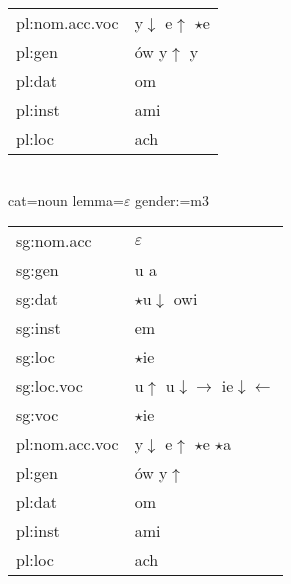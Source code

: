 \documentclass{article}
\begin{document}
\begin{multicols}{2}
\begin{tabular}{l|l}
pl:nom.acc.voc & y$\downarrow$ e$\uparrow$ $\star$e\\
pl:gen & ów y$\uparrow$ y\\
pl:dat & om\\
pl:inst & ami\\
pl:loc & ach\\
\end{tabular}\\
cat=noun lemma=$\varepsilon$ gender:=m3\\
\begin{tabular}{l|l}
sg:nom.acc & $\varepsilon$\\
sg:gen & u a\\
sg:dat & $\star$u$\downarrow$ owi\\
sg:inst & em\\
sg:loc & $\star$ie\\
sg:loc.voc & u$\uparrow$ u$\downarrow\rightarrow$ ie$\downarrow\leftarrow$\\
sg:voc & $\star$ie\\
pl:nom.acc.voc & y$\downarrow$ e$\uparrow$ $\star$e $\star$a\\
pl:gen & ów y$\uparrow$\\
pl:dat & om\\
pl:inst & ami\\
pl:loc & ach\\
\end{tabular}\\
\end{multicols}
\end{document}
